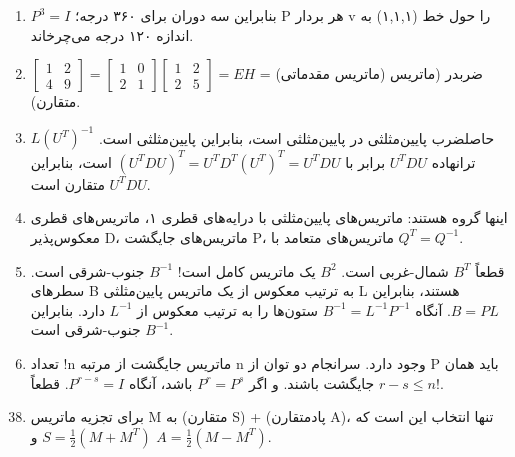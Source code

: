 \documentclass[12pt,a4paper]{article}
\begin{document}
{\begin{enumerate}
			\item $P^3=I$ بنابراین سه دوران برای ۳۶۰ درجه؛ P هر بردار v را حول خط (۱,۱,۱) به اندازه ۱۲۰ درجه می‌چرخاند.
			
			\item $\begin{bmatrix} 1 & 2 \\ 4 & 9 \end{bmatrix} = \begin{bmatrix} 1 & 0 \\ 2 & 1 \end{bmatrix} \begin{bmatrix} 1 & 2 \\ 2 & 5 \end{bmatrix} = EH$ = (ماتریس مقدماتی) ضربدر (ماتریس متقارن).
			
			\item $L(U^T)^{-1}$ حاصلضرب پایین‌مثلثی در پایین‌مثلثی است، بنابراین پایین‌مثلثی است. ترانهاده $U^TDU$ برابر با $(U^TDU)^T = U^TD^T(U^T)^T = U^TDU$ است، بنابراین $U^TDU$ متقارن است.
			
			\item اینها گروه هستند: ماتریس‌های پایین‌مثلثی با درایه‌های قطری ۱، ماتریس‌های قطری معکوس‌پذیر D، ماتریس‌های جایگشت P، ماتریس‌های متعامد با $Q^T=Q^{-1}$.
			
			\item قطعاً $B^T$ شمال-غربی است. $B^2$ یک ماتریس کامل است! $B^{-1}$ جنوب-شرقی است. سطرهای B به ترتیب معکوس از یک ماتریس پایین‌مثلثی L هستند، بنابراین $B=PL$. آنگاه $B^{-1}=L^{-1}P^{-1}$ ستون‌ها را به ترتیب معکوس از $L^{-1}$ دارد. بنابراین $B^{-1}$ جنوب-شرقی است.
			
			\item تعداد !n ماتریس جایگشت از مرتبه n وجود دارد. سرانجام دو توان از P باید همان جایگشت باشند. و اگر $P^r=P^s$ باشد، آنگاه $P^{r-s}=I$. قطعاً $r-s \le n!$.
			
		\end{enumerate}
		
		\begin{enumerate}
			\setcounter{enumi}{37}
			\item برای تجزیه ماتریس M به (متقارن S) + (پادمتقارن A)، تنها انتخاب این است که $S = \frac{1}{2}(M+M^T)$ و $A = \frac{1}{2}(M-M^T)$.
			

\end{enumerate}}
\end{document}
